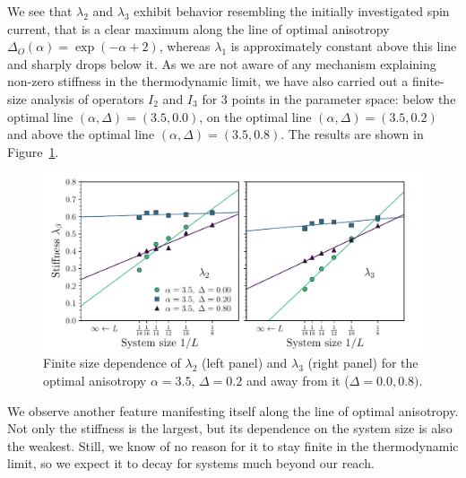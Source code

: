 We see that \(\lambda_2\) and \(\lambda_3\) exhibit behavior resembling the initially investigated spin current,
that is a clear maximum along the line of optimal anisotropy \(\Delta_{O}(\alpha) = \exp(-\alpha + 2)\),
whereas \(\lambda_1\) is approximately constant above this line and sharply drops below it.
As we are not aware of any mechanism explaining non-zero stiffness in the thermodynamic limit, we
have also carried out a finite-size analysis of operators \(I_2\) and \(I_3\) for 3 points in the parameter space:
below the optimal line \((\alpha,\Delta) = (3.5,0.0)\), on the optimal line \((\alpha,\Delta) = (3.5,0.2)\) and
above the optimal line \((\alpha,\Delta) = (3.5,0.8)\). The results are shown in Figure~\ref{fig:stiffness_finite_size}.


\begin{figure}[htbp]
  \centering
  \includegraphics[width=0.8\linewidth]{Figures/finite_size.pdf}
  \caption{Finite size dependence of \(\lambda_2\) (left panel) and \(\lambda_3\) (right panel) for the
  optimal anisotropy \(\alpha = 3.5\), \(\Delta = 0.2\) and away from it (\(\Delta = 0.0,0.8)\).}
  \label{fig:stiffness_finite_size}
\end{figure}
We observe another feature manifesting itself along the line of optimal anisotropy. Not only
the stiffness is the largest, but its dependence on the system size is also the weakest. Still,
we know of no reason for it to stay finite in the thermodynamic limit, so we expect it to
decay for systems much beyond our reach.

